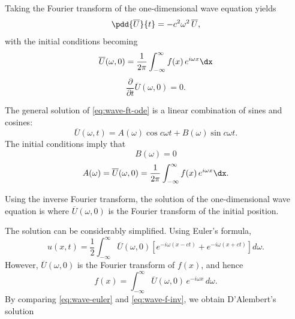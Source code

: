 Taking the Fourier transform of the one-dimensional wave equation yields
\begin{equation}
\label{eq:wave-ft-ode}
\pdd{\overline{U}}{t} = -c^2\omega^2\,\overline{U},
\end{equation}
with the initial conditions becoming
\begin{equation}
\label{eq:wave-ft-ic1}
\overline{U}(\omega,0) = \frac{1}{2\pi}\int_{-\infty}^{\infty}f(x)\,e^{i\omega x}\dx
\end{equation}
\begin{equation}
\label{eq:wave-ft-ic2}
\frac{\partial}{\partial t}\overline{U}(\omega,0) = 0.
\end{equation}

The general solution of \eqref{eq:wave-ft-ode} is a linear combination of sines and cosines:
\begin{equation}
\label{eq:wave-ft-gen}
\overline{U}(\omega,t) = A(\omega)\cos c\omega t + B(\omega)\sin c\omega t.
\end{equation}
The initial conditions imply that
\begin{equation}
\label{eq:wave-B0}
B(\omega) = 0
\end{equation}
\begin{equation}
\label{eq:wave-A-ic}
A(\omega) = \overline{U}(\omega,0) = \frac{1}{2\pi}\int_{-\infty}^{\infty}f(x)\,e^{i\omega x}\dx.
\end{equation}

Using the inverse Fourier transform, the solution of the one-dimensional wave equation is
where $\overline{U}(\omega,0)$ is the Fourier transform of the initial position.

The solution can be considerably simplified.  Using Euler's formula,
\begin{equation}
\label{eq:wave-euler}
u(x,t) = \frac{1}{2}\int_{-\infty}^{\infty}\overline{U}(\omega,0)\left[e^{-i\omega(x-ct)} + e^{-i\omega(x+ct)}\right]d\omega.
\end{equation}
However, $\overline{U}(\omega,0)$ is the Fourier transform of $f(x)$, and hence
\begin{equation}
\label{eq:wave-f-inv}
f(x) = \int_{-\infty}^{\infty}\overline{U}(\omega,0)\,e^{-i\omega x}\,d\omega.
\end{equation}
By comparing \eqref{eq:wave-euler} and \eqref{eq:wave-f-inv}, we obtain D'Alembert's solution

